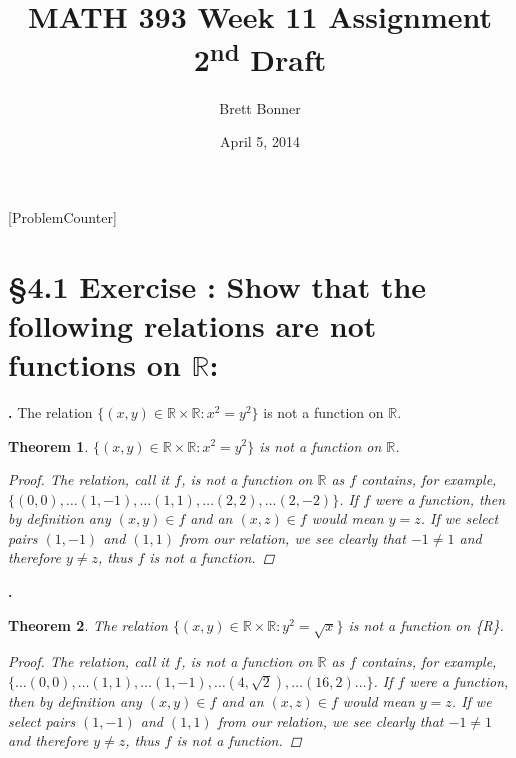 \documentclass[a4paper,11pt]{article}
\begin{document}
\newtheorem*{theorem1}{Theorem}
\newtheorem*{theorem2}{Theorem}
\newtheorem*{theorem3}{Theorem}
\newtheorem*{theorem4}{Theorem}
\newtheorem*{theorem5}{Theorem}
\newtheorem*{theorem6}{Theorem}
\newtheorem*{theorem7}{Theorem}
\newtheorem*{theorem8}{Theorem}
\newtheorem*{theorem9}{True/False?}
\title{MATH 393 Week 11 Assignment 2\textsuperscript{nd} Draft}
\author{Brett Bonner}
\date{April 5, 2014}
\maketitle
\doublespacing
{}
[ProblemCounter]

\setcounter{ProblemCounter}{1}
\section*{\S 4.1 Exercise : Show that the following relations are not functions on \(\mathbb{R}\):}
\setcounter{SubsectionCounter}{1}
\textbf{.}
The relation \(\{{(x,y)}\in \mathbb{R}\times \mathbb{R}: x^{2} = y^{2}\}\) is not a function on \(\mathbb{R}\).
\begin{theorem1}
  \(\{{(x,y)}\in \mathbb{R}\times \mathbb{R}: x^{2} = y^{2}\}\) is not a 
  function on  \(\mathbb{R}\).
  \begin{proof}
  The relation, call it \(f\), is not a function on \(\mathbb{R}\) as \(f\) 
  contains, for example, \(\{{(0,0)}, \ldots {(1,-1), \ldots {(1,1)}, \ldots {(2,2)}, \ldots 
  {(2,-2)}}\}\). If \(f\) were a function, then by definition any \({(x,y)}\in f\) and an \({(x,z)} \in f\) would mean 
  \(y=z\). If we select pairs \({(1,-1)}\) and \({(1,1)}\) from our relation, we 
  see clearly that \(-1 \neq 1\) and therefore \(y \neq z\), thus \(f\) is not a 
  function.
   \end{proof}
  \end{theorem1}
  \setcounter{SubsectionCounter}{4}
\noindent\textbf{.}
\begin{theorem1}
  The relation \(\{{(x,y)}\in \mathbb{R}\times \mathbb{R}: y^{2} = \sqrt{x}\}\) is 
not a function on \{R\}.
\begin{proof}
  The relation, call it \(f\), is not a function on \(\mathbb{R}\) as \(f\) 
  contains, for example, \(\{\ldots {(0,0), \ldots {(1,1)}, \ldots {(1,-1)}, \ldots {(4,\sqrt{2})}, \ldots 
  {(16,2)}}\ldots\}\). If \(f\) were a function, then by definition any \({(x,y)}\in f\) and an \({(x,z)} \in f\) would mean 
  \(y=z\). If we select pairs \({(1,-1)}\) and \({(1,1)}\) from our relation, we 
  see clearly that \(-1 \neq 1\) and therefore \(y \neq z\), thus \(f\) is not a 
  function.
\end{proof}
\end{theorem1}
\newpage
\noindent\setcounter{ProblemCounter}{7}
\end{document}
